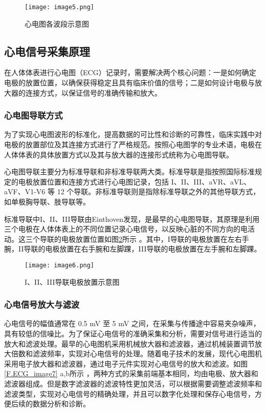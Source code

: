 \begin{figure}[hbt]
    \centering
    \texttt{[image: image5.png]}
    \caption{心电图各波段示意图}
    \label{F.ECG_image5}
\end{figure}

\subsection{心电信号采集原理}
在人体体表进行心电图（ECG）记录时，需要解决两个核心问题：一是如何确定电极的放置位置，以确保获得稳定且具有临床价值的信号；二是如何设计电极与放大器的连接方式，以保证信号的准确传输和放大。

\subsubsection{心电图导联方式}

为了实现心电图波形的标准化，提高数据的可比性和诊断的可靠性，临床实践中对电极的放置部位及其连接方式进行了严格规范。按照心电图学的专业术语，电极在人体体表的具体放置方式以及其与放大器的连接形式统称为心电图导联。

心电图导联主要分为标准导联和非标准导联两大类。标准导联是指按照国际标准规定的电极放置位置和连接方式进行心电图记录，包括 I、II、III、aVR、aVL、aVF、V1-V6 等 12 个导联。非标准导联则是指除标准导联之外的其他导联方式，如单极胸导联、肢导联等。

标准导联中I、II、III导联由Einthoven发现，是最早的心电图导联，其原理是利用三个电极在人体体表上的不同位置记录心电信号，以反映心脏的不同方向的电活动。这三个导联的电极放置位置如图\ref{F.ECG_image6}所示 \cite{现代医学电子仪器原理与设计} 。其中，I导联的电极放置在左右手腕，II导联的电极放置在右手腕和左脚踝，III导联的电极放置在左手腕和左脚踝。

\begin{figure}[hbt]
    \centering
    \texttt{[image: image6.png]}
    \caption{I、II、III导联电极放置示意图}
    \label{F.ECG_image6}
\end{figure}

\subsubsection{心电信号放大与滤波}

心电信号的幅值通常在 0.5 mV 至 5 mV 之间，在采集与传播途中容易夹杂噪声，具有较低的信噪比。为了保证心电信号的准确采集和分析，需要对信号进行适当的放大和滤波处理。最早的心电图机采用机械放大器和滤波器，通过机械装置调节放大倍数和滤波频率，实现对心电信号的处理。随着电子技术的发展，现代心电图机采用电子放大器和滤波器，通过电子元件实现对心电信号的放大和滤波。如图\ref{F.ECG_image7} a,b所示 \cite{现代医学电子仪器原理与设计} ，两种方式的采集前端基本相同，均由电极、放大器和滤波器组成。但是数字滤波器的滤波特性更加灵活，可以根据需要调整滤波频率和滤波类型，实现对心电信号的精确处理，并且可以数字化处理和保存心电信号，方便后续的数据分析和诊断。

